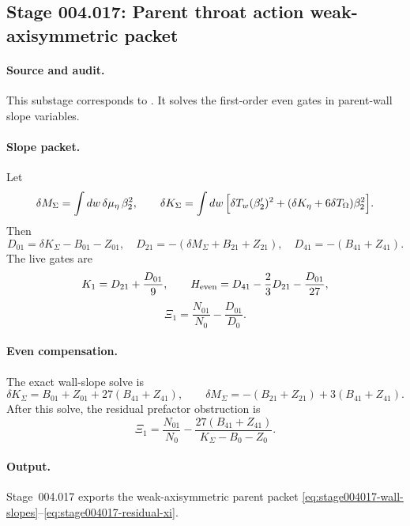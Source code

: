 \subsection*{Stage 004.017: Parent throat action weak-axisymmetric packet}
\label{subsec:stage004017-parent-throat-action-weak-axisym-packet}

\paragraph{Source and audit.}
This substage corresponds to
.
It solves the first-order even gates in parent-wall slope variables.

\paragraph{Slope packet.}
Let
\begin{equation}
\label{eq:stage004017-wall-slopes}
\delta M_\Sigma=\int dw\,\delta\mu_\eta\,\beta_2^2,\qquad
\delta K_\Sigma=\int dw\,\Bigl[\delta T_w(\beta_2')^2+
(\delta K_\eta+6\delta T_\Omega)\beta_2^2\Bigr].
\end{equation}
Then
\begin{equation}
\label{eq:stage004017-denominator-slopes}
D_{01}=\delta K_\Sigma-B_{01}-Z_{01},\quad
D_{21}=-(\delta M_\Sigma+B_{21}+Z_{21}),\quad
D_{41}=-(B_{41}+Z_{41}).
\end{equation}
The live gates are
\begin{equation}
\label{eq:stage004017-gates}
K_1=D_{21}+\frac{D_{01}}9,\qquad
H_{\rm even}=D_{41}-\frac23D_{21}-\frac{D_{01}}{27},
\end{equation}
\begin{equation}
\label{eq:stage004017-xi}
\Xi_1=\frac{N_{01}}{N_0}-\frac{D_{01}}{D_0}.
\end{equation}

\paragraph{Even compensation.}
The exact wall-slope solve is
\begin{equation}
\label{eq:stage004017-wall-slope-solve}
\delta K_\Sigma=B_{01}+Z_{01}+27(B_{41}+Z_{41}),
\qquad
\delta M_\Sigma=-(B_{21}+Z_{21})+3(B_{41}+Z_{41}).
\end{equation}
After this solve, the residual prefactor obstruction is
\begin{equation}
\label{eq:stage004017-residual-xi}
\Xi_1=\frac{N_{01}}{N_0}
-\frac{27(B_{41}+Z_{41})}{K_\Sigma-B_0-Z_0}.
\end{equation}

\paragraph{Output.}
Stage~004.017 exports the weak-axisymmetric parent packet
\eqref{eq:stage004017-wall-slopes}--\eqref{eq:stage004017-residual-xi}.
